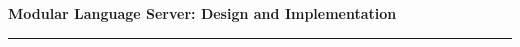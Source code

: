 \newpage
\thispagestyle{empty}

\mbox{}

\vspace{7cm}

\begin{flushright}

\textbf{\LARGE Modular Language Server: Design and Implementation}

\vspace{0.1cm}

\rule{\linewidth}{0.15cm}%
\end{flushright}
